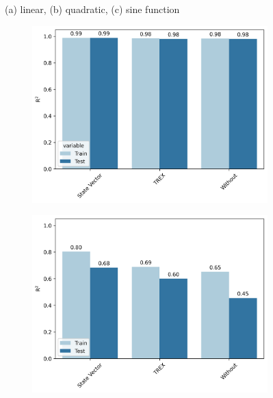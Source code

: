 \documentclass[journal=jacsat,manuscript=article]{achemso}
\begin{document}
\begin{figure}[H]
\begin{subfigure}[b]{0.49\textwidth}
		\caption{}
		\label{fig:sine_learning_curves}
	\end{subfigure}	
	\caption{(a) linear, (b) quadratic, (c) sine function}
	\label{fig:functionfitting_learning_curves}	
\end{figure}




\begin{figure}[H]
	\centering	
	\begin{subfigure}[b]{0.49\textwidth}
		\centering
		\includegraphics[width=\linewidth]{../images/Function_Fitting/linear_error_mitigation.png}
		\caption{}
		\label{fig:linear_error_mitigation}
	\end{subfigure}
	\hfill	
	\begin{subfigure}[b]{0.49\textwidth}
		\centering
		\includegraphics[width=\linewidth]{../images/Function_Fitting/quadratic_error_mitigation.png}

\end{subfigure}
\end{figure}
\end{document}
